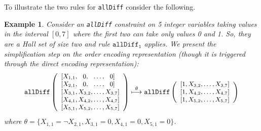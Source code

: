 \documentclass{tlp}
\newtheorem{example}[theorem]{Example}
\begin{document}
To illustrate the two rules for \texttt{allDiff} consider the
following.  
\begin{example}
  Consider an \texttt{allDiff} constraint on 5 integer variables
  taking values in the interval $[0,7]$ where the first two can take
  only values 0 and 1. So, they are a Hall set of size two and rule
  $\mathtt{allDiff_1}$ applies. We present the simplification step on
  the order encoding representation (though it is triggered through
  the direct encoding representation): \vspace{-2mm}
\[\small
\mathtt{allDiff}\left( 
\begin{array}{cccc}
{[}X_{1,1},\hspace{-3mm}&0,\hspace{-3mm}& \ldots,\hspace{-3mm}&0{]} \\
{[}X_{2,1},\hspace{-3mm}&0,\hspace{-3mm}& \ldots,\hspace{-3mm}&0{]} \\
{[}X_{3,1},\hspace{-3mm}&X_{3,2},\hspace{-3mm}& \ldots,\hspace{-3mm}&X_{3,7}{]} \\
{[}X_{4,1},\hspace{-3mm}&X_{4,2},\hspace{-3mm}& \ldots,\hspace{-3mm}&X_{4,7}{]} \\
{[}X_{5,1},\hspace{-3mm}&X_{5,2},\hspace{-3mm}& \ldots,\hspace{-3mm}&X_{5,7}{]}
\end{array}
\right)
\overset{\theta}{\longmapsto}
\mathtt{allDiff}\left(
\begin{array}{ccc}
{[}1,X_{3,2},\hspace{-3mm}& \ldots,\hspace{-3mm}&X_{3,7}{]} \\
{[}1,X_{4,2},\hspace{-3mm}& \ldots,\hspace{-3mm}&X_{4,7}{]} \\
{[}1,X_{5,2},\hspace{-3mm}& \ldots,\hspace{-3mm}&X_{5,7}{]}
\end{array}
\right)
\]
where $\theta = \{ X_{1,1}=\neg X_{2,1} , X_{3,1}=0 , X_{4,1}=0 ,
X_{5,1}=0\}$.


\end{example}
\end{document}
